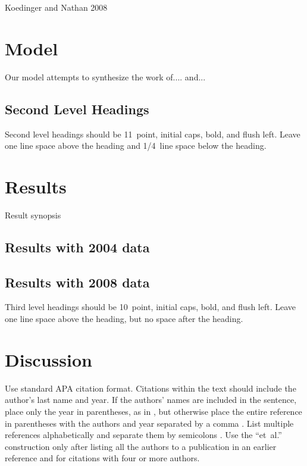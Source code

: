 \documentclass[10pt,letterpaper]{article}
\begin{document}
Koedinger and Nathan 2008



\section{Model}

Our model attempts to synthesize the work of.... and...


\subsection{Second Level Headings}

Second level headings should be 11~point, initial caps, bold, and
flush left. Leave one line space above the heading and 1/4~line
space below the heading.

\section{Results}

Result synopsis

\subsection{Results with 2004 data}

\subsection{Results with 2008 data}

Third level headings should be 10~point, initial caps, bold, and flush
left. Leave one line space above the heading, but no space after the
heading.


\section{Discussion}

Use standard APA citation format. Citations within the text should
include the author's last name and year. If the authors' names are
included in the sentence, place only the year in parentheses, as in
, but otherwise place the entire reference in
parentheses with the authors and year separated by a comma
\cite{Nathan2012}. List multiple references alphabetically and
separate them by semicolons
\cite{Nathan2012,KoedNath2004}. Use the
``et~al.'' construction only after listing all the authors to a
publication in an earlier reference and for citations with four or
more authors.
\end{document}
